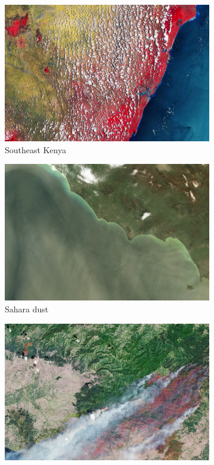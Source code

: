 \documentclass[conference]{IEEEtran}
\begin{document}
\begin{figure}
  \begin{subfigure}{.3\linewidth}
    \includegraphics[width=\linewidth]{figures/Earth_from_Space_Southeast_Kenya}
    \caption{Southeast Kenya}
    \label{fig:sentinel_kenya}
  \end{subfigure}
  \hfill
  \begin{subfigure}{.3\linewidth}
    \includegraphics[width=\linewidth]{figures/Saharan_dust_plume}
    \caption{Sahara dust}
    \label{fig:sentinel_sahara}
  \end{subfigure}
  \hfill
  \begin{subfigure}{.3\linewidth}
    \includegraphics[width=\linewidth]{figures/Wildfires_continue_to_rage_in_Greece}

\end{subfigure}
\end{figure}
\end{document}
